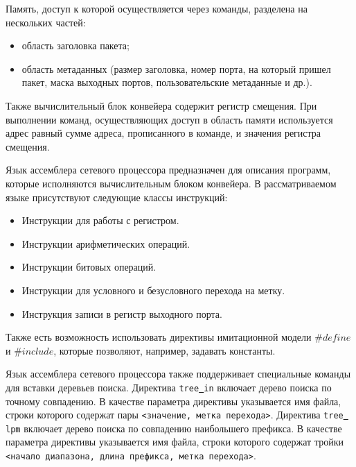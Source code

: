 \documentclass[oneside,final,12pt]{extarticle}
\begin{document}
            Память, доступ к которой осуществляется через команды, разделена на нескольких частей:
            \begin{itemize}
                \item область заголовка пакета;
                \item область метаданных (размер заголовка, номер порта, на который пришел пакет, маска выходных портов, пользовательские метаданные и др.).
            \end{itemize}

            Также вычислительный блок конвейера содержит регистр смещения. При выполнении команд, 
            осуществляющих доступ в область памяти используется адрес равный сумме адреса, 
            прописанного в команде, и значения регистра смещения.

            Язык ассемблера сетевого процессора предназначен для описания программ, 
            которые исполняются вычислительным блоком конвейера. 
            В рассматриваемом языке присутствуют следующие классы инструкций:
            \begin{itemize}
                \item Инструкции для работы с регистром.
                \item Инструкции арифметических операций.
                \item Инструкции битовых операций.
                \item Инструкции для условного и безусловного перехода на метку.
                \item Инструкция записи в регистр выходного порта.
            \end{itemize}
            Также есть возможность использовать директивы имитационной модели $\#define$ и $\#include$, 
            которые позволяют, например, задавать константы.
           
            Язык ассемблера сетевого процессора также поддерживает специальные команды 
            для вставки деревьев поиска. Директива \texttt{tree\underline{ }in} включает дерево 
            поиска по точному совпадению. В качестве параметра директивы указывается имя файла, 
            строки которого содержат пары \texttt{<значение, метка перехода>}. 
            Директива \texttt{tree\underline{ }lpm} включает дерево поиска по совпадению наибольшего 
            префикса. В качестве параметра директивы указывается имя файла, 
            строки которого содержат тройки \texttt{<начало диапазона, длина префикса, метка перехода>}.
\end{document}
